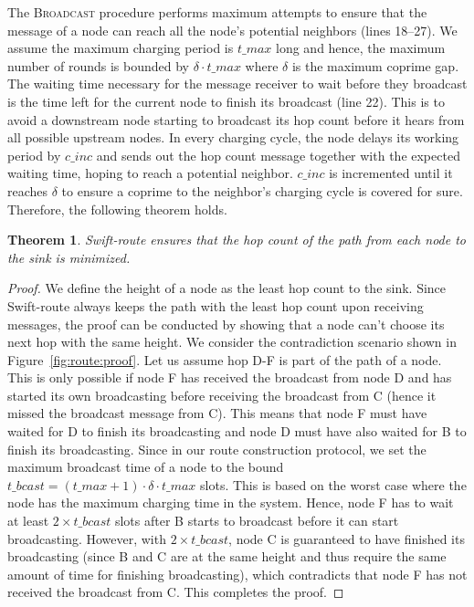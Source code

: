 \documentclass[lettersize,journal]{IEEEtran}
\newtheorem{theorem}{Theorem}
\newcommand{\route}{Swift-route\xspace}
\begin{document}
The \textsc{Broadcast} procedure performs maximum attempts to ensure that the message of a node can reach all the node's potential neighbors (lines 18--27). We assume the maximum charging period is $t\_max$ long and hence, the maximum number of rounds is bounded by $\delta \cdot t\_max$ where $\delta$ is the maximum coprime gap. The waiting time necessary for the message receiver to wait before they broadcast is the time left for the current node to finish its broadcast (line 22). This is to avoid a downstream node starting to broadcast its hop count before it hears from all possible upstream nodes. In every charging cycle, the node delays its working period by $c\_inc$ and sends out the hop count message together with the expected waiting time, hoping to reach a potential neighbor. $c\_inc$ is incremented until it reaches $\delta$ to ensure a coprime to the neighbor's charging cycle is covered for sure. Therefore, the following theorem holds.

\begin{theorem}
    \route ensures that the hop count of the path from each node to the sink is minimized.
\end{theorem}
\begin{proof}
    We define the height of a node as the least hop count to the sink. Since \route always keeps the path with the least hop count upon receiving messages, the proof can be conducted by showing that a node can't choose its next hop with the same height. We consider the contradiction scenario shown in Figure~\ref{fig:route:proof}. 
    Let us assume hop D-F is part of the path of a node. This is only possible if node F has received the broadcast from node D and has started its own broadcasting before receiving the broadcast from C (hence it missed the broadcast message from C). This means that node F must have waited for D to finish its broadcasting and node D must have also waited for B to finish its broadcasting. Since in our route construction protocol, we set the maximum broadcast time of a node to the bound $t\_bcast = (t\_max + 1)\cdot \delta \cdot t\_max$ slots. This is based on the worst case where the node has the maximum charging time in the system. Hence, node F has to wait at least $2\times t\_bcast$ slots after B starts to broadcast before it can start broadcasting. However, with $2\times t\_bcast$, node C is guaranteed to have finished its broadcasting (since B and C are at the same height and thus require the same amount of time for finishing broadcasting), which contradicts that node F has not received the broadcast from C. This completes the proof. 
\end{proof}
\end{document}
